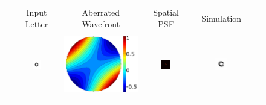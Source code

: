 
\begin{figure}[h]
	\centering

	\begin{tabular}{@{}r@{ } c@{ } c@{ } c@{ } c@{ } c }
	&
	\small{Input Letter} &
	\small{Aberrated Wavefront} &
	\small{Spatial PSF} &
	\small{Simulation} & \\ \\

	\begin{sideways} \parbox[b]{25mm} {} \end{sideways} &
	\includegraphics[width= 0.22\textwidth]{__Images/05/synthetic_sims/C_20-200@4x.png} &
	\includegraphics[height=0.22\textwidth]{__Images/05/synthetic_sims/Wavefront_0,5D,-2@45.png} &
	\includegraphics[width= 0.22\textwidth]{__Images/05/synthetic_sims/PSF_0,5D,-2@45.png} &
	\includegraphics[width= 0.22\textwidth]{__Images/05/synthetic_sims/C_20-200_f50_simulated(0,5D,-2@45).png} 			\\ \\


\end{tabular}
\end{figure}
